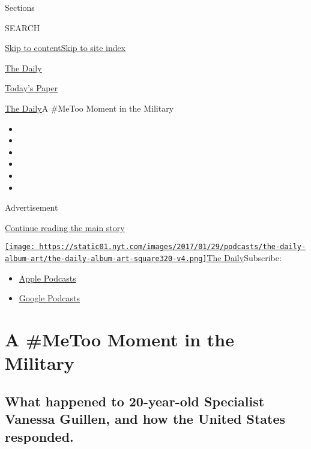 Sections

SEARCH

\protect\hyperlink{site-content}{Skip to
content}\protect\hyperlink{site-index}{Skip to site index}

\href{https://www.nytimes.com/podcasts/the-daily}{The Daily}

\href{https://myaccount.nytimes.com/auth/login?response_type=cookie\&client_id=vi}{}

\href{https://www.nytimes.com/section/todayspaper}{Today's Paper}

\href{/podcasts/the-daily}{The Daily}\textbar{}A \#MeToo Moment in the
Military

\begin{itemize}
\item
\item
\item
\item
\item
\item
\end{itemize}

Advertisement

\protect\hyperlink{after-top}{Continue reading the main story}

\href{https://www.nytimes.com/column/the-daily}{\texttt{[image: https://static01.nyt.com/images/2017/01/29/podcasts/the-daily-album-art/the-daily-album-art-square320-v4.png]}The
Daily}Subscribe:

\begin{itemize}
\tightlist
\item
  \href{https://itunes.apple.com/us/podcast/id1200361736}{Apple
  Podcasts}
\item
  \href{https://www.google.com/podcasts?feed=aHR0cHM6Ly9yc3MuYXJ0MTkuY29tL3RoZS1kYWlseQ\%3D\%3D}{Google
  Podcasts}
\end{itemize}

\hypertarget{a-metoo-moment-in-the-military}{%
\section{A \#MeToo Moment in the
Military}\label{a-metoo-moment-in-the-military}}

\hypertarget{what-happened-to-20-year-old-specialist-vanessa-guillen-and-how-the-united-states-responded}{%
\subsection{What happened to 20-year-old Specialist Vanessa Guillen, and
how the United States
responded.}\label{what-happened-to-20-year-old-specialist-vanessa-guillen-and-how-the-united-states-responded}}

